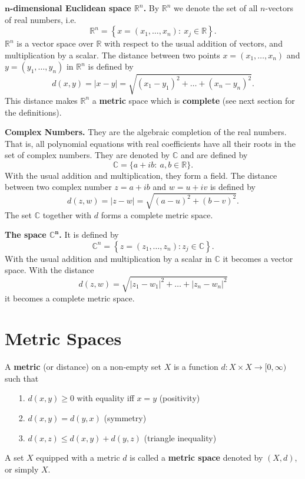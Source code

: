 \documentclass[12pt]{report}
\begin{document}
\bigskip
\noindent
\textbf{$\mathbf{n}$-dimensional Euclidean space $\mathbb{R}^n$.} 
By
$\mathbb{R}^n$ we denote the set of all $n$-vectors of real numbers,
i.e.
\[
\mathbb{R}^n = \left \{x = (x_1, \dots, x_n): \ x_j \in \mathbb{R}
\right \}.
\]
$\mathbb{R}^n$ is a vector space over $\mathbb{R}$ with respect to
the usual addition of vectors, and multiplication by a  scalar.  The
distance between two points $x = (x_1, \dots, x_n)$ and $y = (y_1,
\dots, y_n)$ in $\mathbb{R}^n$ is defined by 
\[ d(x, y) = |x-y| = \sqrt{(x_1 - y_1)^2 + \dots +(x_n - y_n)^2}.
\] This distance makes $\mathbb{R}^n$ a \textbf{metric} space which
is
\textbf{complete} (see next section for the definitions).

\medskip
\noindent
\textbf{Complex Numbers.}  They are the algebraic completion of
the real numbers.  That is, all  polynomial equations with real
coefficients have all their roots in  the set of complex numbers. 
They are denoted by $\mathbb{C}$ and are defined by
\[
\mathbb{C} = \{a + ib:\  a, b \in \mathbb{R}\}.
\] With the usual addition and multiplication, they form a field.  The
distance between two complex number $z = a + ib$ and $w = u + iv$ is
defined by
\[ d(z, w) = |z - w| = \sqrt{(a-u)^2 + (b - v)^2}.
\] The set $\mathbb{C}$ together with $d$ forms a complete metric
space.

\bigskip
\noindent
\textbf{The space $\mathbb{C}^{\mathbf{n}}$.}  It is defined by 
\[
\mathbb{C}^n = \left \{z = (z_1, \dots, z_n): z_j \in \mathbb{C} \right
\}.
\] 
With the usual addition and multiplication by a scalar in
$\mathbb{C}$ it becomes a vector space.  With the distance
\[ d(z, w) = \sqrt{|z_1 - w_1|^2 + \dots+ |z_n - w_n|^2}
\] it becomes a complete metric space.

\section{Metric Spaces}
A \textbf{metric} (or distance) on a non-empty set $X$ is a function $d: X
\times X
\longrightarrow [0, \infty)$ such that

\begin{itemize}
\item[1.]  $d(x, y) \ge 0$ with equality iff $x = y$ (positivity)
\item[2.]  $d(x, y) = d(y, x)$ (symmetry)
\item[3.]  $d(x, z) \le d(x, y) + d(y, z)$ (triangle inequality)
\end{itemize} A set $X$ equipped with a metric $d$ is called a
\textbf{metric space} denoted by
$(X, d)$, or simply $X$.
\end{document}
